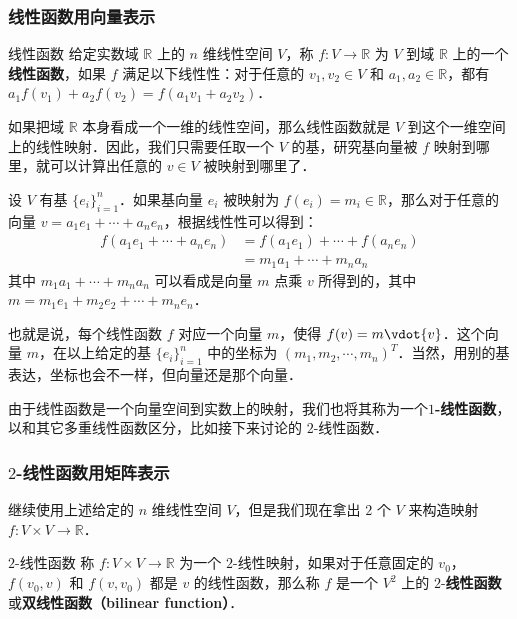 \subsubsection{线性函数用向量表示}
\begin{definition}{线性函数}
给定实数域 $\mathbb{R}$ 上的 $n$ 维线性空间 $V$，称 $f:V\rightarrow \mathbb{R}$ 为 $V$ 到域 $\mathbb{R}$ 上的一个\textbf{线性函数}，如果 $f$ 满足以下线性性：对于任意的 ${v}_1, {v}_2\in V$ 和 $a_1, a_2\in\mathbb{R}$，都有 $a_1f({v}_1)+a_2f({v}_2)=f(a_1{v}_1+a_2{v}_2)$．
\end{definition}

如果把域 $\mathbb{R}$ 本身看成一个一维的线性空间，那么线性函数就是 $V$ 到这个一维空间上的线性映射．因此，我们只需要任取一个 $V$ 的基，研究基向量被 $f$ 映射到哪里，就可以计算出任意的 ${v}\in V$ 被映射到哪里了．

设 $V$ 有基 $\{{e}_i\}_{i=1}^n$．如果基向量 ${e}_i$ 被映射为 $f({e}_i)=m_i\in\mathbb{R}$，那么对于任意的向量 ${v}=a_1{e}_1+\cdots+a_n{e}_n$，根据线性性可以得到：
\begin{equation}
\begin{aligned}
f(a_1{e}_1+\cdots+a_n{e}_n)&=f(a_1{e}_1)+\cdots+f(a_n{e}_n)\\
&=m_1a_1+\cdots+m_na_n
\end{aligned}
\end{equation}
其中 $m_1a_1+\cdots+m_na_n$ 可以看成是向量 ${m}$ 点乘 ${v}$ 所得到的，其中 ${m}=m_1{e}_1+m_2{e}_2+\cdots+m_n{e}_n$．

也就是说，每个线性函数 $f$ 对应一个向量 ${m}$，使得 $f({v})={m}\vdot{v}$．这个向量 ${m}$，在以上给定的基 $\{{e}_i\}_{i=1}^n$ 中的坐标为 $(m_1, m_2, \cdots, m_n)^T$．当然，用别的基表达，坐标也会不一样，但向量还是那个向量．

由于线性函数是一个向量空间到实数上的映射，我们也将其称为一个\textbf{$1$-线性函数}，以和其它多重线性函数区分，比如接下来讨论的 $2$-线性函数．

\subsubsection{$2$-线性函数用矩阵表示}

继续使用上述给定的 $n$ 维线性空间 $V$，但是我们现在拿出 $2$ 个 $V$ 来构造映射 $f:V\times V\rightarrow\mathbb{R}$．

\begin{definition}{$2$-线性函数}\label{Tensor_def1}
称 $f:V\times V\rightarrow\mathbb{R}$ 为一个 $2$-线性映射，如果对于任意固定的 ${v}_0$，$f({v}_0, {v})$ 和 $f({v}, {v}_0)$ 都是 ${v}$ 的线性函数，那么称 $f$ 是一个 $V^2$ 上的 $2$-\textbf{线性函数}或\textbf{双线性函数（bilinear function）}．
\end{definition}

